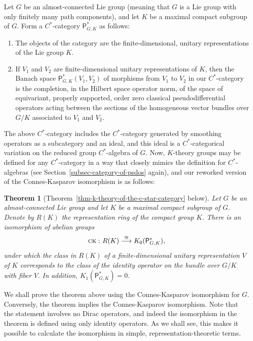 \documentclass[leqno,11pt]{amsart}
\numberwithin{equation}{subsection}
\theoremstyle{plain}
\newtheorem*{theorem*}{Theorem}
\theoremstyle{definition}
\theoremstyle{remark}
\newcommand{\PSDO}{\mathsf{P}}
\newcommand{\CoKa}{{\textsc{\textsf{ck}}}\,}
\begin{document}
Let $G$ be an  almost-connected Lie group (meaning that $G$ is a Lie group with only  finitely many path components), and let $K$ be a maximal compact subgroup of $G$. Form   a $C^*$-category $\PSDO^*_{G,K}$ as follows: 
\begin{enumerate}[\rm (i)]

\item The objects of the category are the finite-dimensional, unitary representations of the Lie group  $K$. 

\item If $V_1$ and $V_2$ are finite-dimensional unitary representations of $K$, then the Banach space  $\PSDO^*_{G,K} (V_1,V_2)$ of morphisms from $V_1$ to $V_2$ in our $C^*$-category  is the completion, in the Hilbert space operator norm,  of the space of equivariant, properly supported,  order zero classical pseudodifferential operators 
acting between the sections of the homogeneous vector bundles over $G/K$ associated to $V_1$ and $V_2$.
\end{enumerate}
The above $C^*$-category includes the $C^*$-category generated by smoothing operators as a subcategory and an ideal, and this ideal is a $C^*$-categorical variation on the reduced group $C^*$-algebra of $G$. Now, $K$-theory groups may be defined for any $C^*$-category in a way that closely mimics the definition for $C^*$-algebras (see Section~\ref{subsec-category-of-psdos} again), and  our reworked version of the Connes-Kasparov isomorphism is as follows:


\begin{theorem*}[Theorem~\ref{thm-k-theory-of-the-c-star-category} below]
Let $G$ be an almost-connected Lie group and let $K$ be a maximal compact subgroup of $G$.
Denote by $R(K)$ the representation ring of the compact group $K$. There is an isomorphism of abelian groups 
\[
\CoKa\colon R(K) \stackrel \cong \longrightarrow K_0 (\PSDO^*_{G,K}) ,
\]
under which the class  in $R(K)$ of a finite-dimensional   unitary representation $V$ of $K$ corresponds to the class   of the identity operator on the bundle over $G/K$ with fiber $V$. In addition, $K_1(\PSDO^*_{G,K}) =0$.
\end{theorem*}

We shall prove the theorem above using the Connes-Kasparov isomorphism for $G$. Conversely, the theorem implies the Connes-Kasp\-arov isomorphism. Note   that the statement involves no Dirac operators, and indeed the isomorphism in the theorem is defined using only identity operators. As we shall see, this makes it possible to calculate  the isomorphism in simple, representation-theoretic terms.
\end{document}
